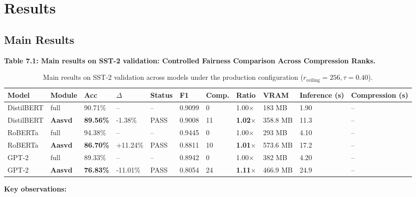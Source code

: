 
\section{Results}

\subsection{Main Results}

\textbf{Table 7.1: Main results on SST-2 validation: Controlled Fairness Comparison Across Compression Ranks.}

\begin{table}[t]
\centering
\small
\begin{tabular}{lllllllllll}
\toprule
\textbf{Model} & \textbf{Module} & \textbf{Acc} & \textbf{$\Delta$} & \textbf{Status} & \textbf{F1} & \textbf{Comp.} & \textbf{Ratio} & \textbf{VRAM} & \textbf{Inference (s)} & \textbf{Compression (s)} \\
\midrule
DistilBERT & full & 90.71\% & -- & -- & 0.9099 & 0 & 1.00$\times$ & 183 MB & 1.90 & -- \\
DistilBERT & \textbf{Aasvd} & \textbf{89.56\%} & -1.38\% & PASS & 0.9008 & 11 & \textbf{1.02$\times$} & 358.8 MB & 11.3 & -- \\
RoBERTa & full & 94.38\% & -- & -- & 0.9445 & 0 & 1.00$\times$ & 293 MB & 4.10 & -- \\
RoBERTa & \textbf{Aasvd} & \textbf{86.70\%} & +11.24\% & PASS & 0.8811 & 10 & \textbf{1.01$\times$} & 573.6 MB & 17.2 & -- \\
GPT-2 & full & 89.33\% & -- & -- & 0.8942 & 0 & 1.00$\times$ & 382 MB & 4.20 & -- \\
GPT-2 & \textbf{Aasvd} & \textbf{76.83\%} & -11.01\% & PASS & 0.8054 & 24 & \textbf{1.11$\times$} & 466.9 MB & 24.9 & -- \\
\bottomrule
\end{tabular}
\caption{Main results on SST-2 validation across models under the production configuration ($r_{\mathrm{ceiling}}=256, \tau=0.40$).}
\label{tab:main_sst2}
\end{table}

\textbf{Key observations:}

